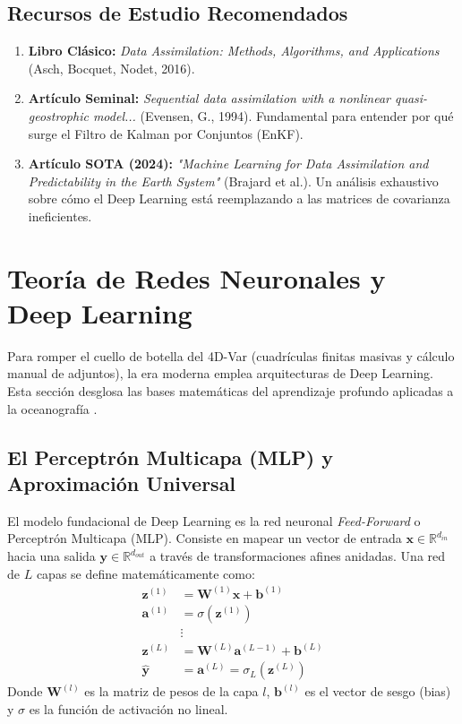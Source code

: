 \documentclass[11pt,a4paper]{article}
\begin{document}
\subsection{Recursos de Estudio Recomendados}
\begin{enumerate}
    \item \textbf{Libro Clásico:} \textit{Data Assimilation: Methods, Algorithms, and Applications} (Asch, Bocquet, Nodet, 2016). 
    \item \textbf{Artículo Seminal:} \textit{Sequential data assimilation with a nonlinear quasi-geostrophic model...} (Evensen, G., 1994). Fundamental para entender por qué surge el Filtro de Kalman por Conjuntos (EnKF).
    \item \textbf{Artículo SOTA (2024):} \textit{"Machine Learning for Data Assimilation and Predictability in the Earth System"} (Brajard et al.). Un análisis exhaustivo sobre cómo el Deep Learning está reemplazando a las matrices de covarianza ineficientes.
\end{enumerate}

\newpage
\section{Teoría de Redes Neuronales y Deep Learning}

Para romper el cuello de botella del 4D-Var (cuadrículas finitas masivas y cálculo manual de adjuntos), la era moderna emplea arquitecturas de Deep Learning. Esta sección desglosa las bases matemáticas del aprendizaje profundo aplicadas a la oceanografía \cite{sonnewald2023}.

\subsection{El Perceptrón Multicapa (MLP) y Aproximación Universal}
El modelo fundacional de Deep Learning es la red neuronal \textit{Feed-Forward} o Perceptrón Multicapa (MLP). Consiste en mapear un vector de entrada $\mathbf{x} \in \mathbb{R}^{d_{in}}$ hacia una salida $\mathbf{y} \in \mathbb{R}^{d_{out}}$ a través de transformaciones afines anidadas.
Una red de $L$ capas se define matemáticamente como:
\begin{align}
\mathbf{z}^{(1)} &= \mathbf{W}^{(1)} \mathbf{x} + \mathbf{b}^{(1)} \\
\mathbf{a}^{(1)} &= \sigma(\mathbf{z}^{(1)}) \\
&\vdots \nonumber \\
\mathbf{z}^{(L)} &= \mathbf{W}^{(L)} \mathbf{a}^{(L-1)} + \mathbf{b}^{(L)} \\
\hat{\mathbf{y}} &= \mathbf{a}^{(L)} = \sigma_L(\mathbf{z}^{(L)})
\end{align}
Donde $\mathbf{W}^{(l)}$ es la matriz de pesos de la capa $l$, $\mathbf{b}^{(l)}$ es el vector de sesgo (bias) y $\sigma$ es la función de activación no lineal.
\end{document}
